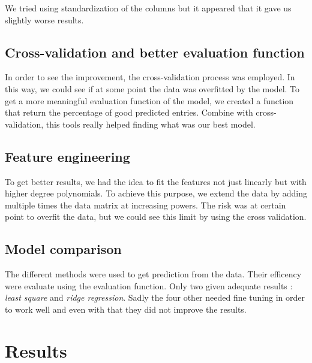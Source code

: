 \documentclass[10pt,conference,compsocconf]{IEEEtran}
\begin{document}
We tried using standardization of the columns but it appeared that it gave us slightly worse results.

\subsection{Cross-validation and better evaluation function}
In order to see the improvement, the cross-validation process was employed. In this way, we could see if at some point the data was overfitted by the model. To get a more meaningful evaluation function of the model, we created a function that return the percentage of good predicted entries. Combine with cross-validation, this tools really helped finding what was our best model.

\subsection{Feature engineering}
To get better results, we had the idea to fit the features not just linearly but with higher degree polynomials. To achieve this purpose, we extend the data by adding multiple times the data matrix at increasing powers. The risk was at certain point to overfit the data, but we could see this limit by using the cross validation. 

\subsection{Model comparison}
The different methods were used to get prediction from the data. Their efficency were evaluate using the evaluation function. Only two given adequate results : \textit{least square} and \textit{ridge regression}. Sadly the four other needed fine tuning in order to work well and even with that they did not improve the results. 




\section{Results}
\end{document}

